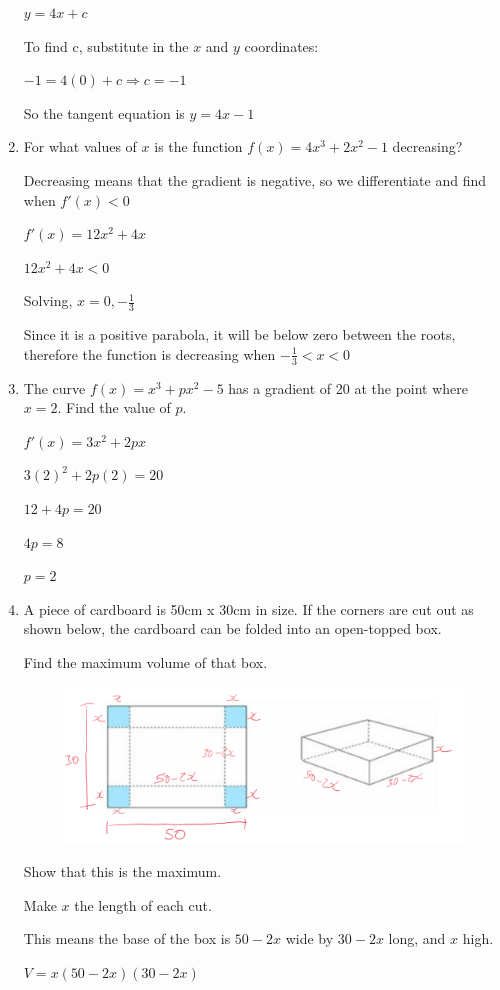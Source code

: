 \documentclass[12pt, letterpaper]{article}
\begin{document}
\begin{enumerate}[itemsep=2cm]
    $y=4x+c$

    To find c, substitute in the $x$ and $y$ coordinates:

    $-1=4(0)+c \Rightarrow c=-1$

    So the tangent equation is $y=4x-1$

    \item 
    For what values of $x$ is the function $f(x)=4x^3+2x^2-1$ decreasing?
    
    Decreasing means that the gradient is negative, so we differentiate and find when $f'(x)<0$

    $f'(x)=12x^2+4x$

    $12x^2+4x<0$

    Solving, $x=0, -\frac{1}{3}$

    Since it is a positive parabola, it will be below zero between the roots, therefore the function is decreasing when $-\frac{1}{3}<x<0$

    \item 
    The curve $f(x)=x^3+px^2-5$ has a gradient of 20 at the point where $x=2$. Find the value of $p$.

    $f'(x)=3x^2+2px$

    $3(2)^2+2p(2)=20$

    $12+4p=20$

    $4p=8$

    $p=2$

    \item 
    A piece of cardboard is 50cm x 30cm in size. If the corners are cut out as shown below, the cardboard can be folded into an open-topped box.

    Find the maximum volume of that box.

    \begin{figure}[h]
        \centering
        \includegraphics[width=0.5\linewidth]{images/annotated_net.png}
    \end{figure}
    Show that this is the maximum.
    
    Make $x$ the length of each cut.

    This means the base of the box is $50-2x$ wide by $30-2x$ long, and $x$ high.

    $V=x(50-2x)(30-2x)$


\end{enumerate}
\end{document}
